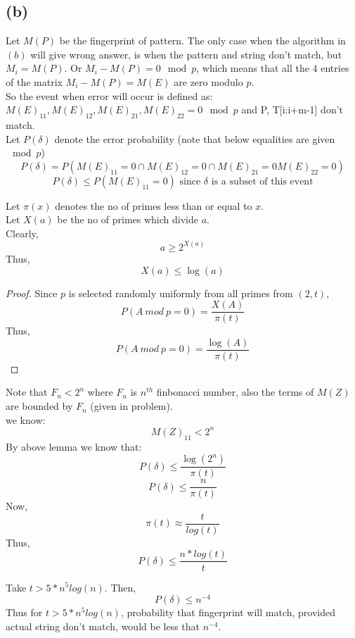 \documentclass[a4paper]{article}
\begin{document}
\subsection*{(b)}
Let $M(P)$ be the fingerprint of pattern.
The only case when the algorithm in $(b)$ will give wrong answer, is when the pattern and string don't match, but $M_i = M(P)$. Or $M_i - M(P) = 0 \mod p$, which means that all the $4$ entries of the matrix $M_i - M(P) = M(E)$ are zero modulo $p$.\\
So the event when error will occur is defined as: $M(E)_{11}, M(E)_{12}, M(E)_{21}, M(E)_{22} = 0 \mod p$ and P, T[i:i+m-1] don't match. \\
Let $P(\delta)$ denote the error probability (note that below equalities are given $\mod p$)
$$P(\delta) = P(M(E)_{11} = 0 \cap M(E)_{12} = 0 \cap M(E)_{21} = 0 M(E)_{22} = 0)$$
$$P(\delta) \leq P(M(E)_{11} = 0) \text{ since $\delta$ is a subset of this event}$$

Let $\pi(x)$ denotes the no of primes less than or equal to $ x$. \\
Let $X(a)$ be the no of primes which divide $a$. \\
Clearly, $$a \geq 2^{X(a)}$$
Thus, $$X(a) \leq \log(a)$$
\begin{warn}[Lemma 1: Probability that $A\ mod\ p = 0$ when $p$ is a random prime no from $(2,t)$ is less than or equal to $\frac{log(A}{\pi(t)}$.]
\end{warn}

\begin{proof}
Since $p$ is selected randomly uniformly from all primes from $(2,t)$,
$$P(A\ mod\ p = 0) = \frac{X(A)}{\pi(t)}$$
Thus, 
$$P(A\ mod\ p = 0) = \frac{\log (A)}{\pi(t)}$$
\end{proof}
Note that $F_n < 2^n$ where $F_n$ is $n^{th}$ finbonacci number, also the terms of $M(Z)$ are bounded by $F_n$ (given in problem).\\
we know: $$M(Z)_{11} < 2^n$$
By above lemma we know that: $$P(\delta) \leq \dfrac{\log (2^n)}{\pi(t)}$$
$$P(\delta) \leq \frac{n}{\pi(t)}$$
Now,
$$\pi(t) \approx \frac{t}{log(t)}$$
Thus, $$P(\delta) \leq \frac{n*log(t)}{t}$$

Take $t > 5*n^5log(n)$. Then, $$P(\delta) \leq n^{-4}$$
Thus for $t > 5*n^5log(n)$, probability that fingerprint will match, provided actual string don't match, would be less that $n^{-4}$.
\end{document}
